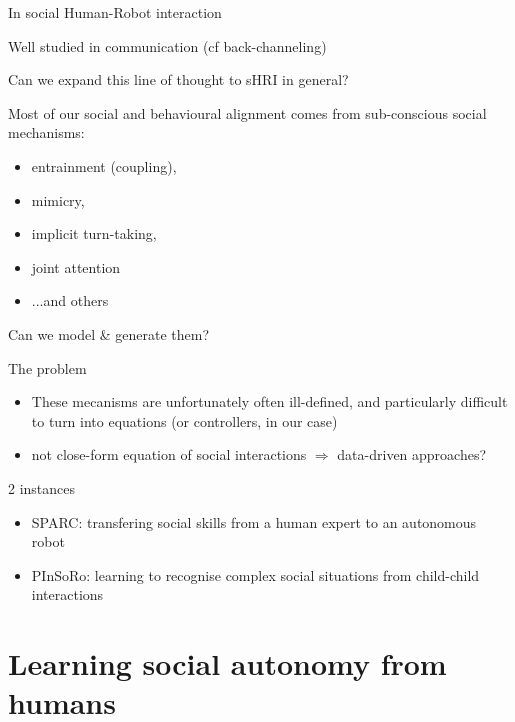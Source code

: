 \documentclass[compress]{beamer}
\begin{document}
\begin{frame}{In social Human-Robot interaction}
    
    Well studied in communication (cf back-channeling)

    Can we expand this line of thought to sHRI in general?

    Most of our social and behavioural alignment comes from sub-conscious social
    mechanisms:

    \begin{itemize}
        \item entrainment (coupling), 
        \item mimicry, 
        \item implicit turn-taking,
        \item joint attention
        \item ...and others
    \end{itemize}
    \pause
    \begin{center}
    Can we model \& generate them?
    \end{center}
\end{frame}

\begin{frame}{The problem}
    \begin{itemize}
        \item These mecanisms are unfortunately often ill-defined, and
            particularly difficult to turn into equations (or controllers, in
            our case)
        \item not close-form equation of social interactions $\Rightarrow$ data-driven approaches?
    \end{itemize}
\end{frame}

\begin{frame}{2 instances}

    \begin{itemize}
        \item SPARC: transfering social skills from a human expert to an autonomous robot
        \item PInSoRo: learning to recognise complex social situations from
            child-child interactions
    \end{itemize}

\end{frame}

\section[Learning social behaviours]{Learning social autonomy from humans}
\end{document}
